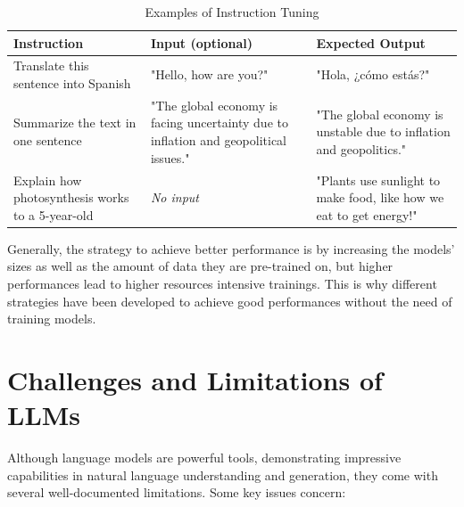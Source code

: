 \begin{table}[b]
    \centering
    \renewcommand{\arraystretch}{1.3}
    \begin{tabularx}{\textwidth}{|X|X|X|}
        \hline
        \textbf{Instruction} & \textbf{Input (optional)} & \textbf{Expected Output} \\
        \hline
        Translate this sentence into Spanish & "Hello, how are you?" & "Hola, ¿cómo estás?" \\
        \hline
        Summarize the text in one sentence & "The global economy is facing uncertainty due to inflation and geopolitical issues." & "The global economy is unstable due to inflation and geopolitics." \\
        \hline
        Explain how photosynthesis works to a 5-year-old & \textit{No input} & "Plants use sunlight to make food, like how we eat to get energy!" \\
        \hline
    \end{tabularx}
    \caption{Examples of Instruction Tuning}
    \label{tab:instruction-tuning}
\end{table}

Generally, the strategy to achieve better performance is by increasing the models’ sizes as well as the amount of data they are pre-trained on, but higher performances lead to higher resources intensive trainings. This is why different strategies have been developed to achieve good performances without the need of training models.




\section{Challenges and Limitations of LLMs}
\label{sec:challenges-llms}

Although language models are powerful tools, demonstrating impressive capabilities in natural language understanding and generation, they come with several well-documented limitations. Some key issues concern:

